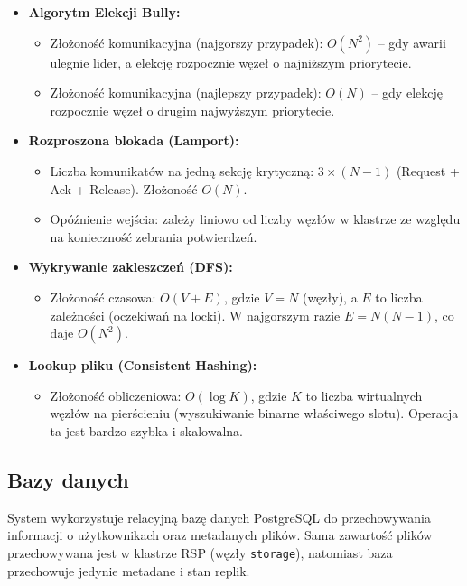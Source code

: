 \documentclass[12pt,a4paper]{article}
\begin{document}
	\begin{itemize}
		\item \textbf{Algorytm Elekcji Bully:}
		\begin{itemize}
			\item Złożoność komunikacyjna (najgorszy przypadek): $O(N^2)$ -- gdy awarii ulegnie lider, a elekcję rozpocznie węzeł o najniższym priorytecie.
			\item Złożoność komunikacyjna (najlepszy przypadek): $O(N)$ -- gdy elekcję rozpocznie węzeł o drugim najwyższym priorytecie.
		\end{itemize}
		
		\item \textbf{Rozproszona blokada (Lamport):}
		\begin{itemize}
			\item Liczba komunikatów na jedną sekcję krytyczną: $3 \times (N-1)$ (Request + Ack + Release). Złożoność $O(N)$.
			\item Opóźnienie wejścia: zależy liniowo od liczby węzłów w klastrze ze względu na konieczność zebrania potwierdzeń.
		\end{itemize}
		
		\item \textbf{Wykrywanie zakleszczeń (DFS):}
		\begin{itemize}
			\item Złożoność czasowa: $O(V + E)$, gdzie $V=N$ (węzły), a $E$ to liczba zależności (oczekiwań na locki). W najgorszym razie $E=N(N-1)$, co daje $O(N^2)$.
		\end{itemize}
		
		\item \textbf{Lookup pliku (Consistent Hashing):}
		\begin{itemize}
			\item Złożoność obliczeniowa: $O(\log K)$, gdzie $K$ to liczba wirtualnych węzłów na pierścieniu (wyszukiwanie binarne właściwego slotu). Operacja ta jest bardzo szybka i skalowalna.
		\end{itemize}
	\end{itemize}

	\subsection{Bazy danych}
	System wykorzystuje relacyjną bazę danych PostgreSQL do przechowywania informacji o użytkownikach oraz metadanych plików. Sama zawartość plików przechowywana jest w klastrze RSP (węzły \texttt{storage}), natomiast baza przechowuje jedynie metadane i stan replik.
\end{document}
